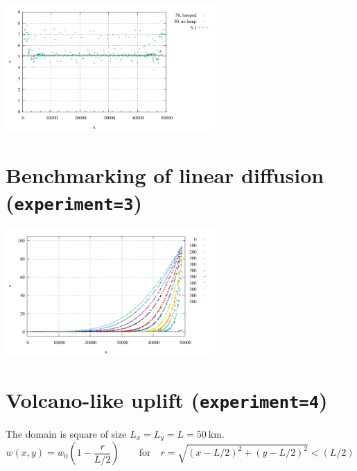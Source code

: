 \begin{center}
\includegraphics[width=8cm]{python_codes/fieldstone_140/results/exp2/elevation}
\end{center}

\section*{Benchmarking of linear diffusion ({\tt experiment=3})}

\begin{center}
\includegraphics[width=8cm]{python_codes/fieldstone_140/results/exp3/elevation}
\end{center}

\section*{Volcano-like uplift ({\tt experiment=4})}

The domain is square of size $L_x=L_y=L=50~\si{\km}$.
\[
w(x,y) = w_0  \left( 1- \frac{r}{L/2} \right) 
\qquad \text{for} \quad r=\sqrt{(x-L/2)^2+(y-L/2)^2}<(L/2)
\]


